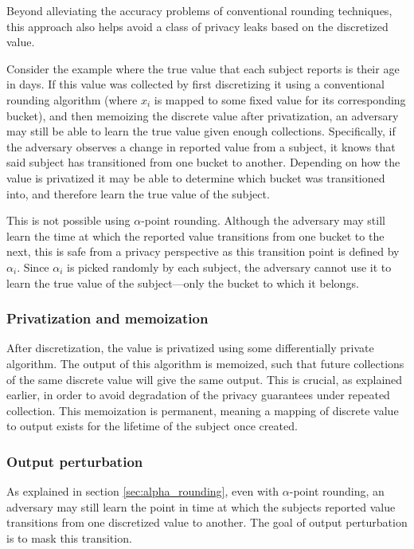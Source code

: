 \documentclass[a4paper,12pt]{article}
\begin{document}
Beyond alleviating the accuracy problems of conventional rounding techniques, this approach also helps avoid a class of privacy leaks based on the discretized value.

Consider the example where the true value that each subject reports is their age in days. If this value was collected by first discretizing it using a conventional rounding algorithm (where $x_i$ is mapped to some fixed value for its corresponding bucket), and then memoizing the discrete value after privatization, an adversary may still be able to learn the true value given enough collections. Specifically, if the adversary observes a change in reported value from a subject, it knows that said subject has transitioned from one bucket to another. Depending on how the value is privatized it may be able to determine which bucket was transitioned into, and therefore learn the true value of the subject.

This is not possible using $\alpha$-point rounding. Although the adversary may still learn the time at which the reported value transitions from one bucket to the next, this is safe from a privacy perspective as this transition point is defined by $\alpha_i$. Since $\alpha_i$ is picked randomly by each subject, the adversary cannot use it to learn the true value of the subject---only the bucket to which it belongs.

\subsubsection{Privatization and memoization}

After discretization, the value is privatized using some differentially private algorithm. The output of this algorithm is memoized, such that future collections of the same discrete value will give the same output. This is crucial, as explained earlier, in order to avoid degradation of the privacy guarantees under repeated collection. This memoization is permanent, meaning a mapping of discrete value to output exists for the lifetime of the subject once created.

\subsubsection{Output perturbation}

As explained in section \ref{sec:alpha_rounding}, even with $\alpha$-point rounding, an adversary may still learn the point in time at which the subjects reported value transitions from one discretized value to another. The goal of output perturbation is to mask this transition.
\end{document}
